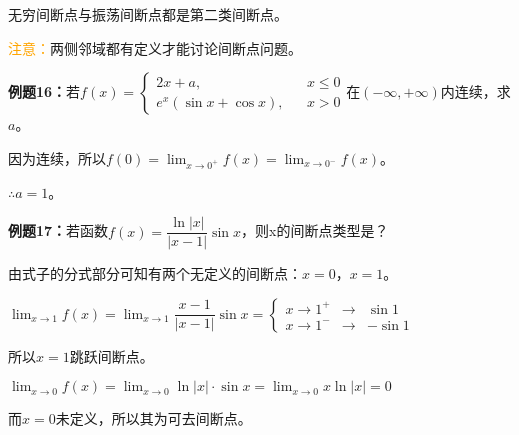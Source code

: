 \documentclass[UTF8]{ctexart}
\begin{document}
无穷间断点与振荡间断点都是第二类间断点。

\textcolor{orange}{注意：}两侧邻域都有定义才能讨论间断点问题。

\textbf{例题16：}若$f(x)=\left\{
    \begin{array}{lcl}
        2x+a, & & x\leqslant 0 \\
        e^x(\sin x+\cos x), & & x>0
    \end{array} \right.
$在$(-\infty,+\infty)$内连续，求$a$。

因为连续，所以$f(0)=\lim_{x\to 0^+}f(x)=\lim_{x\to 0^-}f(x)$。

$\therefore a=1$。

\textbf{例题17：}若函数$f(x)=\dfrac{\ln\vert x\vert}{\vert x-1\vert}\sin x$，则x的间断点类型是？

由式子的分式部分可知有两个无定义的间断点：$x=0$，$x=1$。

$\lim_{x\to 1}f(x)=\lim_{x\to 1}\dfrac{x-1}{\vert x-1\vert}\sin x=\left\{
    \begin{array}{lcl}
        x\to 1^+ & \rightarrow & \sin 1 \\
        x\to 1^- & \rightarrow & -\sin 1
    \end{array} \right.
$

所以$x=1$跳跃间断点。

$\lim_{x\to 0}f(x)=\lim_{x\to 0}\ln\vert x\vert\cdot\sin x=\lim_{x\to 0}x\ln\vert x\vert=0$

而$x=0$未定义，所以其为可去间断点。
\end{document}

